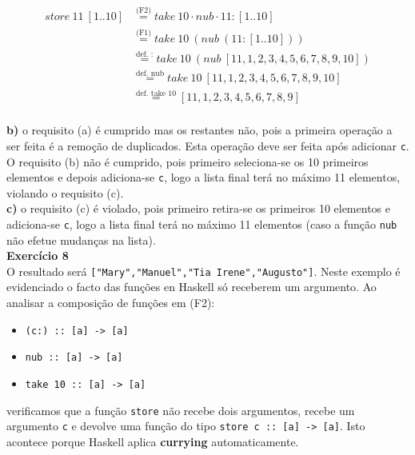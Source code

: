 \documentclass[a4paper,11pt]{article}
\begin{document}
\[
\begin{aligned}
	store \  11 \  [1..10] &\overset{\text{(F2)}}{=} take \  10 \cdot nub \cdot 11:[1..10] \\
	&\overset{\text{(F1)}}{=} take \  10 \  (nub \  (11 : [1..10])) \\
	&\overset{\text{def. :}}{=} take \  10 \  (nub \  [11,1,2,3,4,5,6,7,8,9,10]) \\
	&\overset{\text{def. nub}}{=} take \  10 \  [11,1,2,3,4,5,6,7,8,9,10] \\
	&\overset{\text{def. take 10}}{=} [11,1,2,3,4,5,6,7,8,9] \\
\end{aligned}
\]

\noindent \textbf{b)} o requisito (a) é cumprido mas os restantes não, pois a primeira operação a ser feita é a remoção de duplicados. Esta operação deve ser feita após adicionar \texttt{c}. O requisito (b) não é cumprido, pois primeiro seleciona-se os 10 primeiros elementos e depois adiciona-se \texttt{c}, logo a lista final terá no máximo 11 elementos, violando o requisito (c).\\

\noindent \textbf{c)} o requisito (c) é violado, pois primeiro retira-se os primeiros 10 elementos e adiciona-se \texttt{c}, logo a lista final terá no máximo 11 elementos (caso a função \texttt{nub} não efetue mudanças na lista).\\

\noindent \textbf{Exercício 8}\\

\noindent O resultado será \texttt{["Mary","Manuel","Tia Irene","Augusto"]}. Neste exemplo é evidenciado o facto das funções en Haskell só receberem um argumento. Ao analisar a composição de funções em (F2):

\begin{itemize}
	\item \texttt{(c:) :: [a] -> [a]}
	\item \texttt{nub :: [a] -> [a]}
	\item \texttt{take 10 :: [a] -> [a]}
\end{itemize}

\noindent verificamos que a função \texttt{store} não recebe dois argumentos, recebe um argumento \texttt{c} e devolve uma função do tipo \texttt{store c :: [a] -> [a]}. Isto acontece porque Haskell aplica \textbf{currying} automaticamente.
\end{document}

